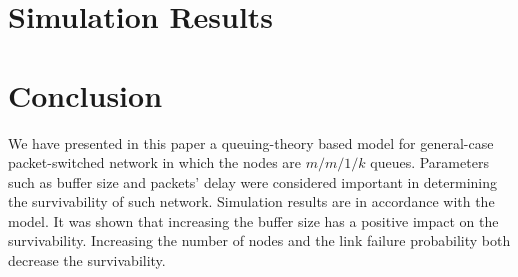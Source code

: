 \documentclass[conference]{IEEEtran}
\begin{document}
    \section{Simulation Results} \label{sec:simres}

    \section{Conclusion} \label{sec:conc}
    We have presented in this paper a queuing-theory based model for general-case packet-switched network in which the nodes are $m/m/1/k$ queues. Parameters such as buffer size and packets' delay were considered important in determining the survivability of such network. Simulation results are in accordance with the model. It was shown that increasing the buffer size has a positive impact on the survivability. Increasing the number of nodes and the link failure probability both decrease the survivability.
\end{document}
